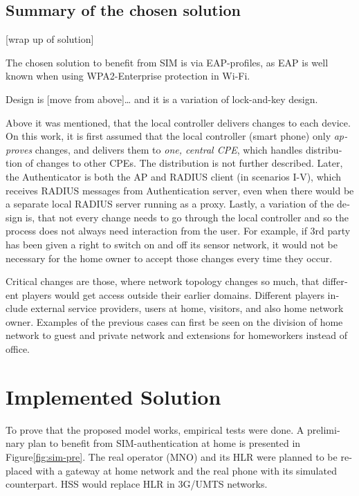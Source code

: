 \documentclass[12pt,a4paper,english]{tutthesis}
\begin{document}
\begin{otherlanguage}{english}
\section{Summary of the chosen solution}
\label{sec-4-9}

[wrap up of solution]

The chosen solution to benefit from SIM is via EAP-profiles, as EAP
is well known when using WPA2-Enterprise protection in Wi-Fi.

Design is [move from above]\ldots{}
and it is a variation of lock-and-key design.

Above it was mentioned, that the local controller delivers changes to each
device. 
On this work, it is first assumed that the local controller (smart
phone) only \emph{approves} changes,
and delivers them to \emph{one, central CPE}, 
which handles distribution of changes to other CPEs. The distribution
is not further described. 
Later, the Authenticator is both the AP and
RADIUS client (in scenarios I-V), which receives RADIUS messages from
Authentication server, even when there would be a separate local RADIUS server
running as a proxy.
Lastly, a variation of the design is, that not every change needs to go
 through  the local controller and so the process does not always need
interaction from the user. For example, if 3rd party has been given 
a right to switch on and off its sensor network, it would not be 
necessary for the home owner to accept those changes every time they occur.



Critical changes are those, where network topology changes so much,
that different players would get access outside their earlier domains.
Different players include external service providers, users at home,
visitors, and also home network owner. Examples of the previous cases can first be
seen on the division of home network to guest and private network and
extensions for homeworkers instead of office.



\chapter{Implemented Solution}
\label{sec-5}


To prove that the proposed model works, empirical tests were done.
A preliminary plan to benefit from SIM-authentication at home is
presented in Figure\ref{fig:sim-pre}. The real operator (MNO) and its HLR were 
planned to be replaced with a gateway at home network and the real phone
with its simulated counterpart. HSS would replace HLR in 3G/UMTS networks.  



\end{otherlanguage}
\end{document}
